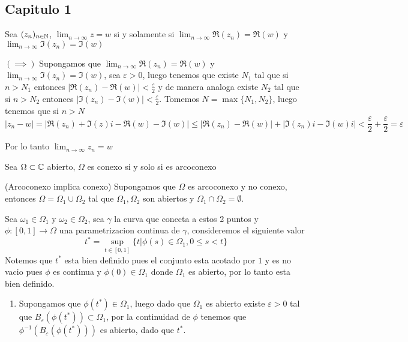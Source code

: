 \documentclass[../main.tex]{subfiles}
\begin{document}
\subsection{Capitulo 1}
\begin{problem}
  Sea $(z_{n})_{n \in \mathbb{N}}$, $\lim_{n \to \infty} z = w$ si y solamente si $\lim_{n \to \infty} \Re(z_{n}) = \Re(w)$ y $\lim_{n \to \infty} \Im(z_{n}) = \Im(w)$
\end{problem}
\begin{solution}
  $(\implies)$ Supongamos que $\lim_{n \to \infty} \Re(z_{n}) = \Re(w)$ y $\lim_{n \to \infty} \Im(z_{n}) = \Im(w)$, sea $\varepsilon > 0$, luego tenemos que existe $N_{1}$ tal que si $n > N_{1}$ entonces $|\Re(z_{n}) - \Re(w)| < \frac{\varepsilon}{2}$ y de manera analoga existe $N_{2}$ tal que si $n > N_{2}$ entonces $|\Im(z_{n}) - \Im(w)| < \frac{\varepsilon}{2}$. Tomemos $N = \max \{N_{1}, N_{2}\}$, luego tenemos que si $n > N$
  \begin{equation*}
    |z_{n} - w| = |\Re(z_{n}) + \Im(z) i - \Re(w) - \Im(w)| \leq |\Re(z_{n}) - \Re(w)| + |\Im(z_{n}) i - \Im(w)i| < \frac{\varepsilon}{2} + \frac{\varepsilon}{2} = \varepsilon
  \end{equation*}

  Por lo tanto $\lim_{n \to \infty} z_{n} = w$
\end{solution}

\begin{problem}
  Sea $\Omega \subset \mathbb{C}$ abierto, $\Omega$ es conexo si y solo si es arcoconexo
\end{problem}
\begin{solution}
  (Arcoconexo implica conexo) Supongamos que $\Omega$ es arcoconexo y no conexo, entonces $\Omega = \Omega_{1} \cup \Omega_{2}$ tal que $\Omega_{1}, \Omega_{2}$ son abiertos y $\Omega_{1} \cap \Omega_{2} = \emptyset$.

  Sea $\omega_{1} \in \Omega_{1}$ y $\omega_{2} \in \Omega_{2}$, sea $\gamma$ la curva que conecta a estos 2 puntos y $\phi : [0, 1] \to \Omega$ una parametrizacion continua de $\gamma$, consideremos el siguiente valor
  \begin{equation*}
    t^{*} = \sup_{t \in [0, 1]} \{t | \phi(s) \in \Omega_{1}, 0 \leq s < t\}
  \end{equation*}
  Notemos que $t^{*}$ esta bien definido pues el conjunto esta acotado por $1$ y es no vacio pues $\phi$ es continua y $\phi(0) \in \Omega_{1}$ donde $\Omega_{1}$ es abierto, por lo tanto esta bien definido.

  \begin{enumerate}
    \item Supongamos que $\phi(t^{*}) \in \Omega_{1}$, luego dado que $\Omega_{1}$ es abierto existe $\varepsilon > 0$ tal que $B_{\varepsilon}(\phi(t^{*})) \subset \Omega_{1}$, por la continuidad de $\phi$ tenemos que $\phi^{-1}(B_{\varepsilon}(\phi(t^{*})))$ es abierto, dado que $t^{*}$.
  \end{enumerate}
\end{solution}
\end{document}
